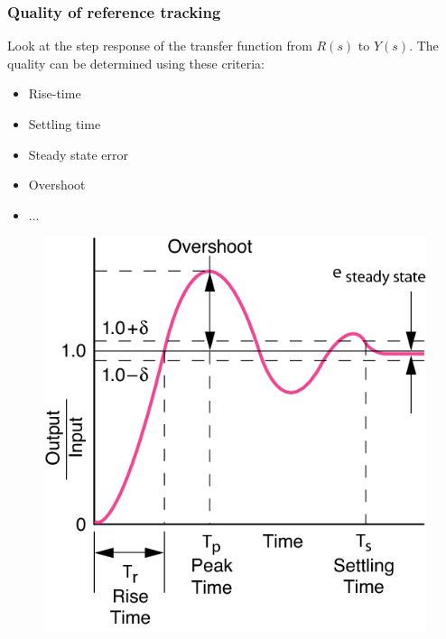 \begin{frame}
	\frametitle{Quality of reference tracking}
	\begin{minipage}{0.5\linewidth}
		\begin{block}{}
			Look at the step response of the transfer function from $R(s)$ to $Y(s)$. The quality can be determined using these criteria:
			\begin{itemize}
				\item Rise-time
				\item Settling time
				\item Steady state error
				\item Overshoot
				\item ...
			\end{itemize}
		\end{block}
	\end{minipage}
	\hfill
	\begin{minipage}{0.4\linewidth}
		\begin{figure}
			\centering
			\includegraphics[width=1\linewidth]{properties}
			\label{fig:properties}
		\end{figure}
	\end{minipage}
\end{frame}

